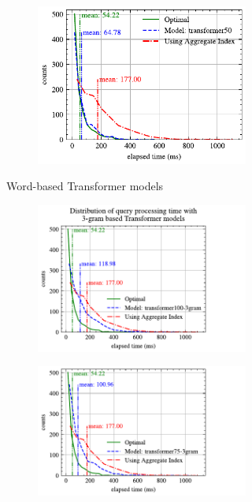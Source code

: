 \begin{figure}[p]
\begin{subfigure}{0.45\textwidth}
\begin{subfigure}{\textwidth}
			\includegraphics[]{my/graphics/perf_dist_transformer50_B.pdf}
		\end{subfigure}
		\caption{Word-based Transformer models}
	\end{subfigure}
	\hfill
	\begin{subfigure}{0.45\textwidth}
		\begin{subfigure}{\textwidth}
			\centering
			\includegraphics[]{my/graphics/perf_dist_transformer100_3gram_B.pdf}
		\end{subfigure}
		\vfill
		\begin{subfigure}{\textwidth}
			\centering
			\includegraphics[]{my/graphics/perf_dist_transformer75_3gram_B.pdf}

\end{subfigure}
\end{subfigure}
\end{figure}
